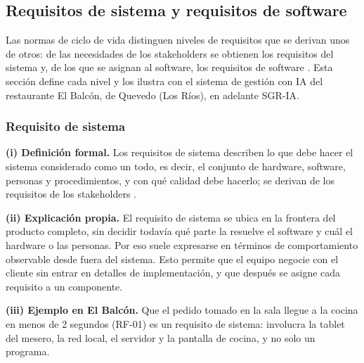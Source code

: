 \subsection{Requisitos de sistema y requisitos de software}
Las normas de ciclo de vida distinguen niveles de requisitos que se derivan unos de otros: de las necesidades de los stakeholders se obtienen los requisitos del sistema y, de los que se asignan al software, los requisitos de software \cite{iso29148,iso15288,ieee12207}. Esta secci\'on define cada nivel y los ilustra con el sistema de gesti\'on con IA del restaurante El Balc\'on, de Quevedo (Los R\'ios), en adelante SGR-IA.

\subsubsection{Requisito de sistema}
\textbf{(i) Definici\'on formal.} Los requisitos de sistema describen lo que debe hacer el sistema considerado como un todo, es decir, el conjunto de hardware, software, personas y procedimientos, y con qu\'e calidad debe hacerlo; se derivan de los requisitos de los stakeholders \cite{iso29148,iso15288}.\par
\textbf{(ii) Explicaci\'on propia.} El requisito de sistema se ubica en la frontera del producto completo, sin decidir todav\'ia qu\'e parte la resuelve el software y cu\'al el hardware o las personas. Por eso suele expresarse en t\'erminos de comportamiento observable desde fuera del sistema. Esto permite que el equipo negocie con el cliente sin entrar en detalles de implementaci\'on, y que despu\'es se asigne cada requisito a un componente.\par
\textbf{(iii) Ejemplo en El Balc\'on.} Que el pedido tomado en la sala llegue a la cocina en menos de 2 segundos (RF-01) es un requisito de sistema: involucra la tablet del mesero, la red local, el servidor y la pantalla de cocina, y no solo un programa.\par

